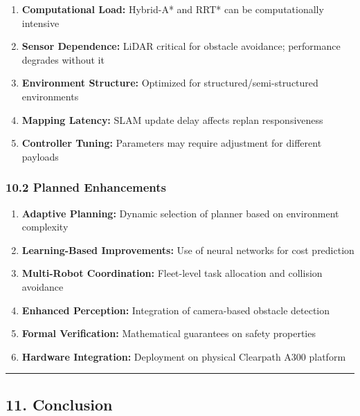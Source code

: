 \begin{enumerate}
\def\labelenumi{\arabic{enumi}.}
\tightlist
\item
  \textbf{Computational Load:} Hybrid-A* and RRT* can be computationally
  intensive
\item
  \textbf{Sensor Dependence:} LiDAR critical for obstacle avoidance;
  performance degrades without it
\item
  \textbf{Environment Structure:} Optimized for
  structured/semi-structured environments
\item
  \textbf{Mapping Latency:} SLAM update delay affects replan
  responsiveness
\item
  \textbf{Controller Tuning:} Parameters may require adjustment for
  different payloads
\end{enumerate}

\hypertarget{planned-enhancements}{%
\subsubsection{10.2 Planned Enhancements}\label{planned-enhancements}}

\begin{enumerate}
\def\labelenumi{\arabic{enumi}.}
\tightlist
\item
  \textbf{Adaptive Planning:} Dynamic selection of planner based on
  environment complexity
\item
  \textbf{Learning-Based Improvements:} Use of neural networks for cost
  prediction
\item
  \textbf{Multi-Robot Coordination:} Fleet-level task allocation and
  collision avoidance
\item
  \textbf{Enhanced Perception:} Integration of camera-based obstacle
  detection
\item
  \textbf{Formal Verification:} Mathematical guarantees on safety
  properties
\item
  \textbf{Hardware Integration:} Deployment on physical Clearpath A300
  platform
\end{enumerate}

\begin{center}\rule{0.5\linewidth}{0.5pt}\end{center}

\hypertarget{conclusion}{%
\subsection{11. Conclusion}\label{conclusion}}

